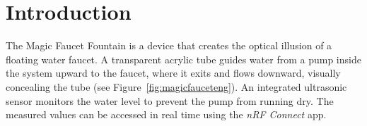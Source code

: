 %
%
%

\section{Introduction}
The Magic Faucet Fountain is a device that creates the optical illusion of a floating water faucet. A transparent acrylic tube guides water from a pump inside the system upward to the faucet, where it exits and flows downward, visually concealing the tube (see Figure~\ref{fig:magicfauceteng}).  
An integrated ultrasonic sensor monitors the water level to prevent the pump from running dry. The measured values can be accessed in real time using the \textit{nRF Connect} app.
